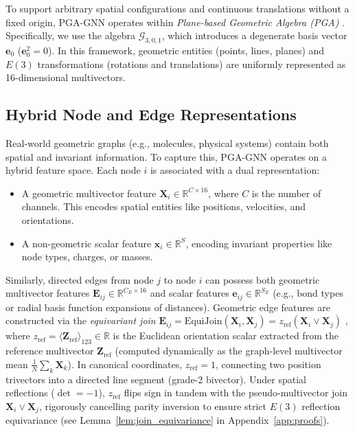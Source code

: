 \documentclass[10pt]{article}
\begin{document}
To support arbitrary spatial configurations and continuous translations without a fixed origin, PGA-GNN operates within \emph{Plane-based Geometric Algebra (PGA)} \citep{pga4cs2020}. 
Specifically, we use the algebra $\mathcal{G}_{3,0,1}$, which introduces a degenerate basis vector $\mathbf{e}_0$ ($\mathbf{e}_0^2 = 0$). In this framework, geometric entities (points, lines, planes) and $E(3)$ transformations (rotations and translations) are uniformly represented as 16-dimensional multivectors.

\subsection{Hybrid Node and Edge Representations}
\label{subsec:repr}

Real-world geometric graphs (e.g., molecules, physical systems) contain both spatial and invariant information. To capture this, PGA-GNN operates on a hybrid feature space. Each node $i$ is associated with a dual representation:
\begin{itemize}
    \item A geometric multivector feature $\mathbf{X}_i \in \mathbb{R}^{C \times 16}$, where $C$ is the number of channels. This encodes spatial entities like positions, velocities, and orientations.
    \item A non-geometric scalar feature $\mathbf{x}_i \in \mathbb{R}^{S}$, encoding invariant properties like node types, charges, or masses.
\end{itemize}
Similarly, directed edges from node $j$ to node $i$ can possess both geometric multivector features $\mathbf{E}_{ij} \in \mathbb{R}^{C_E \times 16}$ and scalar features $\mathbf{e}_{ij} \in \mathbb{R}^{S_E}$ (e.g., bond types or radial basis function expansions of distances). Geometric edge features are constructed via the \emph{equivariant join} $\mathbf{E}_{ij} = \mathrm{EquiJoin}(\mathbf{X}_i, \mathbf{X}_j) = z_{\text{ref}} (\mathbf{X}_i \vee \mathbf{X}_j)$ \citep{gatr}, where $z_{\text{ref}} = \langle \mathbf{Z}_{\text{ref}} \rangle_{123} \in \mathbb{R}$ is the Euclidean orientation scalar extracted from the reference multivector $\mathbf{Z}_{\text{ref}}$ (computed dynamically as the graph-level multivector mean $\frac{1}{N}\sum_k \mathbf{X}_k$). In canonical coordinates, $z_{\text{ref}} = 1$, connecting two position trivectors into a directed line segment (grade-2 bivector). Under spatial reflections ($\det = -1$), $z_{\text{ref}}$ flips sign in tandem with the pseudo-multivector join $\mathbf{X}_i \vee \mathbf{X}_j$, rigorously cancelling parity inversion to ensure strict $E(3)$ reflection equivariance (see Lemma~\ref{lem:join_equivariance} in Appendix~\ref{app:proofs}).
\end{document}
